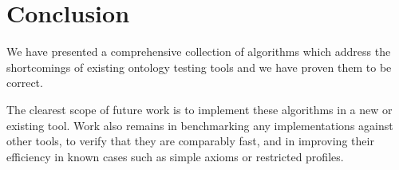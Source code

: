 \documentclass[paper.tex]{subfiles}
\begin{document}
\section{Conclusion}
\label{sec:conclusion}

We have presented a comprehensive collection of algorithms which address the shortcomings of existing ontology testing tools and we have proven them to be correct.  \todo[qualify]

The clearest scope of future work is to implement these algorithms in a new or existing tool.
Work also remains in benchmarking any implementations against other tools, to verify that they are comparably fast, and in improving their efficiency in known cases such as simple axioms or restricted profiles.
\end{document}
